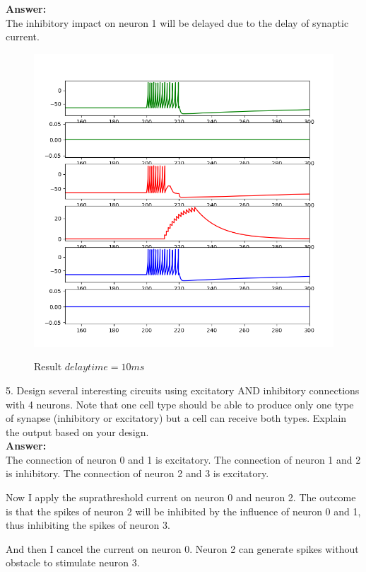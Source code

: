 \documentclass[12pt]{article}
\begin{document}
\textbf{Answer:} 
\\

The inhibitory impact on neuron 1 will be delayed due to the delay of synaptic current.
\begin{figure}[H]
  \centering
  \includegraphics[width=.8\textwidth]{h3_p1_p3_delay.png} %
  \label{img} %
  \caption{Result $delay time = 10 ms$}
\end{figure}
\newpage

5. Design several interesting circuits using excitatory AND inhibitory connections
with 4 neurons. Note that one cell type should be able to produce only one type of
synapse (inhibitory or excitatory) but a cell can receive both types. Explain the
output based on your design.
\\

\textbf{Answer:} 
\\

The connection of neuron 0 and 1 is excitatory. The connection of neuron 1 and 2 is inhibitory.
The connection of neuron 2 and 3 is excitatory.

Now I apply the suprathreshold current on neuron 0 and neuron 2. The outcome is that the spikes of neuron 2 will be inhibited by the influence of neuron 0 and 1, thus inhibiting the spikes of neuron 3.

And then I cancel the current on neuron 0. Neuron 2 can generate spikes without obstacle to stimulate neuron 3.
\end{document}
